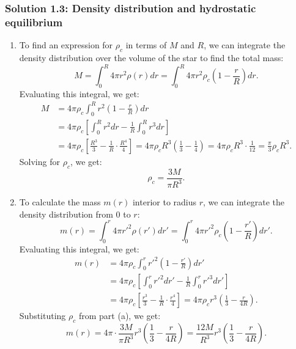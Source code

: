 \subsubsection*{Solution 1.3: Density distribution and hydrostatic equilibrium}
\begin{enumerate}[label=(\alph*)]
    \item To find an expression for $\rho_c$ in terms of $M$ and $R$, we can integrate the density distribution over the volume of the star to find the total mass:
    \begin{equation}
    M = \int_0^R 4\pi r^2 \rho(r) dr = \int_0^R 4\pi r^2 \rho_c \left(1 - \frac{r}{R}\right) dr.
    \end{equation}
    Evaluating this integral, we get:
    \begin{align*}
    M &= 4\pi \rho_c \int_0^R r^2 \left(1 - \frac{r}{R}\right) dr \\
      &= 4\pi \rho_c \left[ \int_0^R r^2 dr - \frac{1}{R} \int_0^R r^3 dr \right] \\
      &= 4\pi \rho_c \left[ \frac{R^3}{3} - \frac{1}{R} \cdot \frac{R^4}{4} \right] = 4\pi \rho_c R^3 \left( \frac{1}{3} - \frac{1}{4} \right) = 4\pi \rho_c R^3 \cdot \frac{1}{12} = \frac{\pi}{3} \rho_c R^3.
    \end{align*}
    Solving for $\rho_c$, we get:
    \begin{equation}
    \rho_c = \frac{3M}{\pi R^3}.
    \end{equation}
    \item To calculate the mass $m(r)$ interior to radius $r$, we can integrate the density distribution from $0$ to $r$:
    \begin{equation}
    m(r) = \int_0^r 4\pi r'^2 \rho(r') dr' = \int_0^r 4\pi r'^2 \rho_c \left(1 - \frac{r'}{R}\right) dr'.
    \end{equation}
    Evaluating this integral, we get:
    \begin{align*}
    m(r) &= 4\pi \rho_c \int_0^r r'^2 \left(1 - \frac{r'}{R}\right) dr' \\
         &= 4\pi \rho_c \left[ \int_0^r r'^2 dr' - \frac{1}{R} \int_0^r r'^3 dr' \right] \\
         &= 4\pi \rho_c \left[ \frac{r^3}{3} - \frac{1}{R} \cdot \frac{r^4}{4} \right] = 4\pi \rho_c r^3 \left( \frac{1}{3} - \frac{r}{4R} \right). 
    \end{align*}
    Substituting $\rho_c$ from part (a), we get:
    \begin{equation}
    m(r) = 4\pi \cdot \frac{3M}{\pi R^3} r^3 \left( \frac{1}{3} - \frac{r}{4R} \right) = \frac{12M}{R^3} r^3 \left( \frac{1}{3} - \frac{r}{4R} \right).

\end{equation}
\end{enumerate}
